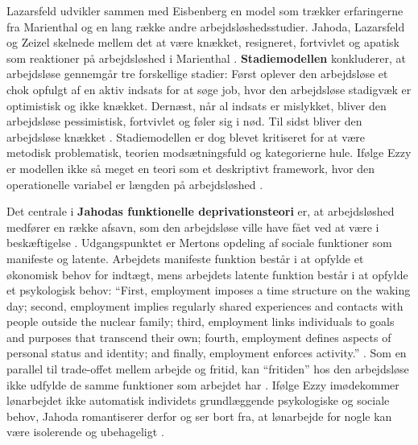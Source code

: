 Lazarsfeld udvikler sammen med Eisbenberg en model som trækker erfaringerne fra Marienthal og en lang række andre arbejdsløshedsstudier. Jahoda, Lazarsfeld og Zeizel skelnede mellem det at være knækket, resigneret, fortvivlet og apatisk som reaktioner på arbejdsløshed i Marienthal \parencite[56]{Jahoda1971}. \textbf{Stadiemodellen} konkluderer, at arbejdsløse gennemgår tre forskellige stadier: Først oplever den arbejdsløse et chok opfulgt af en aktiv indsats for at søge job, hvor den arbejdsløse stadigvæk er optimistisk og ikke knækket. Dernæst, når al indsats er mislykket, bliver den arbejdsløse pessimistisk, fortvivlet og føler sig i nød. Til sidst bliver den arbejdsløse knækket \parencite[378]{Eisenberg1938}. Stadiemodellen er dog blevet kritiseret for at være metodisk problematisk, teorien modsætningsfuld og kategorierne hule. Ifølge Ezzy er modellen ikke så meget en teori som et deskriptivt framework, hvor den operationelle variabel er længden på arbejdsløshed \parencite[44]{Ezzy1993}.

Det centrale i \textbf{Jahodas funktionelle deprivationsteori} er, at arbejdsløshed medfører en række afsavn, som den arbejdsløse ville have fået ved at være i beskæftigelse \parencite[44]{Ezzy1993} %
. Udgangspunktet er Mertons opdeling af sociale funktioner som manifeste og latente. Arbejdets manifeste funktion består i at opfylde et økonomisk behov for indtægt, mens arbejdets latente funktion består i at opfylde et psykologisk behov: “First, employment imposes a time structure on the waking day; second, employment implies regularly shared experiences and contacts with people outside the nuclear family; third, employment links individuals to goals and purposes that transcend their own; fourth, employment defines aspects of personal status and identity; and finally, employment enforces activity.” \parencite[188]{Jahod1981}. Som en parallel til trade-offet mellem arbejde og fritid, kan “fritiden” hos den arbejdsløse ikke udfylde de samme funktioner som arbejdet har \parencite[189]{Jahod1981}. Ifølge Ezzy imødekommer lønarbejdet ikke automatisk individets grundlæggende psykologiske og sociale behov, Jahoda romantiserer derfor og ser bort fra, at lønarbejde for nogle kan være isolerende og ubehageligt \parencite[45]{Ezzy1993}.

